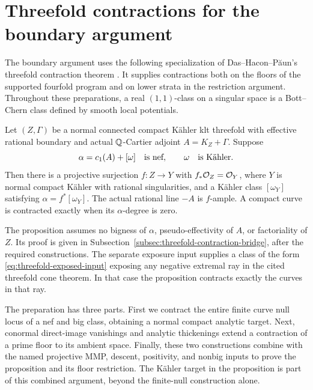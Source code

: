 \section{Threefold contractions for the boundary argument}\label{sec:finite-null}

The boundary argument uses the following specialization of
Das--Hacon--P\u{a}un's threefold contraction theorem
\cite[Theorem~5.5]{DasHaconPaun2024}.  It supplies contractions both on
the floors of the supported fourfold program and on lower strata in the
restriction argument.  Throughout these preparations, a real
\((1,1)\)-class on a singular space is a Bott--Chern class defined by
smooth local potentials.

\begin{proposition}
\label{prop:threefold-contraction}
Let \((Z,\Gamma)\) be a normal connected compact K\"ahler klt threefold
with effective rational boundary and actual \(\mathbb Q\)-Cartier adjoint
\(A=K_Z+\Gamma\).  Suppose
\begin{equation}\label{eq:threefold-exposed-input}
 \alpha=c_1(A)+[\omega]\quad\hbox{is nef},\qquad
 \omega\quad\hbox{is K\"ahler}.
\end{equation}
Then there is a projective surjection \(f:Z\to Y\) with
\(f_*\mathcal O_Z=\mathcal O_Y\), where \(Y\) is normal compact K\"ahler with
rational singularities, and a K\"ahler class \([\omega_Y]\) satisfying
\(\alpha=f^*[\omega_Y]\).  The actual rational line \(-A\) is
\(f\)-ample.  A compact curve is contracted exactly when its
\(\alpha\)-degree is zero.
\end{proposition}

The proposition assumes no bigness of \(\alpha\), pseudo-effectivity
of \(A\), or factoriality of \(Z\).  Its proof is given in
Subsection~\ref{subsec:threefold-contraction-bridge}, after the required
constructions.  The separate exposure input
\cite[Corollary~5.3]{DasHaconPaun2024} supplies a class of the form
\eqref{eq:threefold-exposed-input} exposing any negative extremal ray in
the cited threefold cone theorem.  In that case the proposition contracts
exactly the curves in that ray.

The preparation has three parts.  First we contract the entire finite
curve null locus of a nef and big class, obtaining a normal compact
analytic target.  Next, conormal direct-image vanishings and analytic
thickenings extend a contraction of a prime floor to its ambient space.
Finally, these two constructions combine with the named projective MMP,
descent, positivity, and nonbig inputs to prove the proposition and its
floor restriction.  The K\"ahler target in the proposition is part of
this combined argument, beyond the finite-null construction alone.

